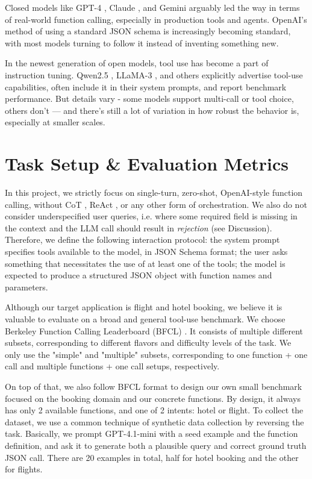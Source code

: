 \documentclass[12pt]{extarticle}
\begin{document}
Closed models like GPT-4 \cite{openai}, Claude \cite{claude}, and Gemini \cite{gemini} arguably led the way in terms of real-world function calling, especially in production tools and agents. OpenAI's method of using a standard JSON schema is increasingly becoming standard, with most models turning to follow it instead of inventing something new.

In the newest generation of open models, tool use has become a part of instruction tuning. Qwen2.5 \cite{qwen25}, LLaMA-3 \cite{llama3}, and others explicitly advertise tool-use capabilities, often include it in their system prompts, and report benchmark performance. But details vary - some models support multi-call or tool choice, others don’t — and there’s still a lot of variation in how robust the behavior is, especially at smaller scales.

\section{Task Setup \& Evaluation Metrics}

In this project, we strictly focus on single-turn, zero-shot, OpenAI-style \cite{openai} function calling, without CoT \cite{cot}, ReAct \cite{react}, or any other form of orchestration. We also do not consider underspecified user queries, i.e. where some required field is missing in the context and the LLM call should result in \textit{rejection} (see Discussion). Therefore, we define the following interaction protocol: the system prompt specifies tools available to the model, in JSON Schema format; the user asks something that necessitates the use of at least one of the tools; the model is expected to produce a structured JSON object with function names and parameters.

Although our target application is flight and hotel booking, we believe it is valuable to evaluate on a broad and general tool-use benchmark. We choose Berkeley Function Calling Leaderboard (BFCL) \cite{bfcl}. It consists of multiple different subsets, corresponding to different flavors and difficulty levels of the task. We only use the "simple" and "multiple" subsets, corresponding to one function + one call and multiple functions + one call setups, respectively.

On top of that, we also follow BFCL format to design our own small benchmark focused on the booking domain and our concrete functions. By design, it always has only 2 available functions, and one of 2 intents: hotel or flight. To collect the dataset, we use a common technique of synthetic data collection by reversing the task. Basically, we prompt GPT-4.1-mini with a seed example and the function definition, and ask it to generate both a plausible query and correct ground truth JSON call. There are 20 examples in total, half for hotel booking and the other for flights.
\end{document}
